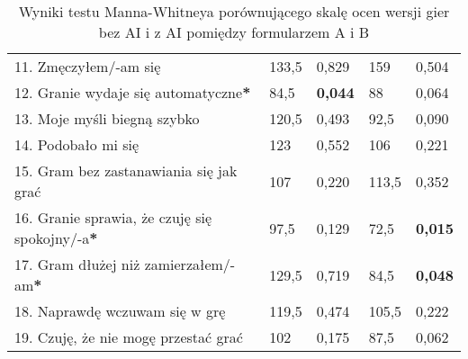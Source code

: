 \begin{table}[h!]
\begin{center}
\begin{tabular}{|m{10em}|m{5em}|m{5em}|m{5em}|m{5em}|}
            11. Zmęczyłem/-am się                                             & 133,5                       & 0,829            & 159                     & 0,504          \\
            12. Granie wydaje się automatyczne\textbf{*}                      & 84,5                        & \textbf{0,044}   & 88                      & 0,064          \\
            13. Moje myśli \newline biegną szybko                             & 120,5                       & 0,493            & 92,5                    & 0,090          \\
            14. Podobało mi się                                               & 123                         & 0,552            & 106                     & 0,221          \\
            15. Gram bez zastanawiania się jak grać                           & 107                         & 0,220            & 113,5                   & 0,352          \\
            16. Granie sprawia, \newline że czuję się spokojny/-a\textbf{*}   & 97,5                        & 0,129            & 72,5                    & \textbf{0,015} \\
            17. Gram dłużej \newline niż zamierzałem/-am\textbf{*}            & 129,5                       & 0,719            & 84,5                    & \textbf{0,048} \\
            18. Naprawdę wczuwam się w grę                                    & 119,5                       & 0,474            & 105,5                   & 0,222          \\
            19. Czuję, że nie mogę przestać grać                              & 102                         & 0,175            & 87,5                    & 0,062          \\
            \hline
        \end{tabular}
    \end{center}
    \caption{Wyniki testu Manna-Whitneya porównującego skalę ocen wersji gier bez AI i z AI pomiędzy formularzem A i B}\label{tab1:ch7_14}
\end{table}


